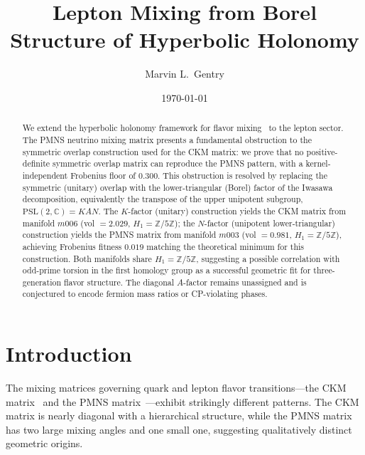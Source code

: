\documentclass[floatfix,aps,prd,twocolumn,showpacs,superscriptaddress,longbibliography]{revtex4-2}
\newcommand{\PSL}{\mathrm{PSL}(2,\mathbb{C})}
\newcommand{\Zfive}{\mathbb{Z}/5\mathbb{Z}}
\begin{document}
\title{Lepton Mixing from Borel Structure of Hyperbolic Holonomy}

\author{Marvin L.~Gentry}

\date{\today}

\begin{abstract}
We extend the hyperbolic holonomy framework for flavor mixing~\cite{Gentry:CKM}
to the lepton sector. The PMNS neutrino mixing matrix presents a fundamental
obstruction to the symmetric overlap construction used for the CKM matrix:
we prove that no positive-definite symmetric overlap matrix can reproduce the
PMNS pattern, with a kernel-independent Frobenius floor of $0.300$.
This obstruction is resolved by replacing the symmetric (unitary) overlap
with the lower-triangular (Borel) factor of the Iwasawa decomposition, equivalently the transpose of the upper unipotent subgroup,
$\PSL = KAN$. The $K$-factor (unitary) construction yields the CKM matrix
from manifold $m006$ (vol $= 2.029$, $H_1 = \Zfive$); the $N$-factor
(unipotent lower-triangular) construction yields the PMNS matrix from
manifold $m003$ (vol $= 0.981$, $H_1 = \Zfive$), achieving Frobenius
fitness $0.019$ matching the theoretical minimum for this construction.
Both manifolds share $H_1 = \Zfive$, suggesting a possible correlation with odd-prime torsion in the
first homology group as a successful geometric fit for three-generation
flavor structure. The diagonal $A$-factor remains unassigned and is
conjectured to encode fermion mass ratios or CP-violating phases.
\end{abstract}


\maketitle

\section{Introduction}
\label{sec:intro}

The mixing matrices governing quark and lepton flavor transitions---the
CKM matrix~\cite{Cabibbo:1963yz,Kobayashi:1973fv} and the PMNS
matrix~\cite{Pontecorvo:1957cp,Maki:1962mu}---exhibit strikingly different
patterns. The CKM matrix is nearly diagonal with a hierarchical structure,
while the PMNS matrix has two large mixing angles and one small one,
suggesting qualitatively distinct geometric origins.
\end{document}
